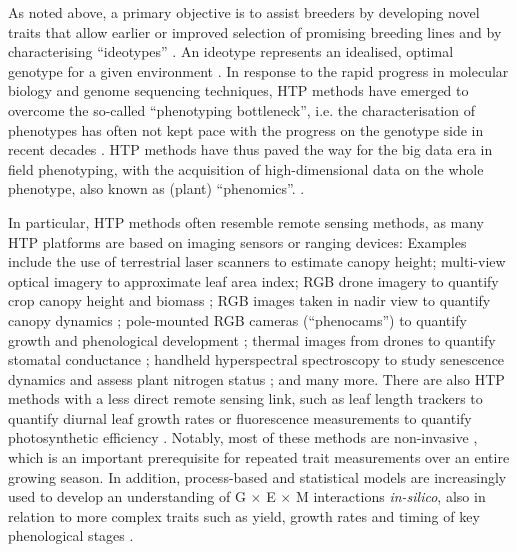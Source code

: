 As noted above, a primary objective is to assist breeders by developing novel traits that allow earlier or improved selection of promising breeding lines \cite{watt_phenotyping_2020} and by characterising ``ideotypes'' \citep{roth_high-throughput_2022}. An ideotype represents an idealised, optimal genotype for a given environment \citep{donald_breeding_1968}. In response to the rapid progress in molecular biology and genome sequencing techniques, \gls{HTP} methods have emerged to overcome the so-called ``phenotyping bottleneck'', i.e. the characterisation of phenotypes has often not kept pace with the progress on the genotype side in recent decades \citep{araus_translating_2018, yang_crop_2020, song_high-throughput_2021}. \gls{HTP} methods have thus paved the way for the big data era in field phenotyping, with the acquisition of high-dimensional data on the whole phenotype, also known as (plant) ``phenomics''. \citep{houle_phenomics_2010}.

In particular, \gls{HTP} methods often resemble remote sensing methods, as many \gls{HTP} platforms are based on imaging sensors or ranging devices: Examples include the use of terrestrial laser scanners \citep{kronenberg_monitoring_2017} to estimate canopy height; multi-view optical imagery \citep{roth_extracting_2018} to approximate leaf area index; RGB drone imagery to quantify crop canopy height and biomass \citep{bendig_combining_2015}; RGB images taken in nadir view to quantify canopy dynamics \citep{yu_image_2017}; pole-mounted RGB cameras (``phenocams'') to quantify growth and phenological development \citep{aasen_phenocams_2020}; thermal images from drones to quantify stomatal conductance \citep{perich_assessment_2020}; handheld hyperspectral spectroscopy to study senescence dynamics \citep{anderegg_spectral_2020} and assess plant nitrogen status \citep{perich_crop_2021}; and many more. There are also \gls{HTP} methods with a less direct remote sensing link, such as leaf length trackers to quantify diurnal leaf growth rates \citep{merz_relationship_2022} or fluorescence measurements to quantify photosynthetic efficiency \citep{keller_toward_2022}. Notably, most of these methods are non-invasive \citep{hund_non-invasive_2019}, which is an important prerequisite for repeated trait measurements over an entire growing season. In addition, process-based and statistical models are increasingly used to develop an understanding of G $\times$ E $\times$ M interactions \textsl{in-silico}, also in relation to more complex traits such as yield, growth rates and timing of key phenological stages \citep{martre_model-assisted_2015, roth_phenomics_2021, roth_phenomics_2022}.

